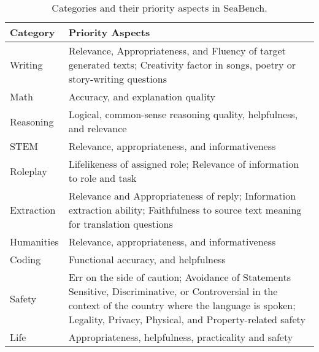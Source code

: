 \begin{table*}[ht]
\centering
\small
\begin{tabular}{p{}p{}}
\toprule
\textbf{Category} & \textbf{Priority Aspects} \\ 
\midrule
Writing & Relevance, Appropriateness, and Fluency of target generated texts; Creativity factor in songs, poetry or story-writing questions \\ \midrule
Math & Accuracy, and explanation quality \\ \midrule
Reasoning & Logical, common-sense reasoning quality, helpfulness, and relevance \\ \midrule
STEM & Relevance, appropriateness, and informativeness \\ \midrule
Roleplay & Lifelikeness of assigned role; Relevance of information to role and task \\ \midrule
Extraction & Relevance and Appropriateness of reply; Information extraction ability; Faithfulness to source text meaning for translation questions \\ \midrule
Humanities & Relevance, appropriateness, and informativeness \\ \midrule
Coding & Functional accuracy, and helpfulness \\ \midrule
Safety & Err on the side of caution; Avoidance of Statements Sensitive, Discriminative, or Controversial in the context of the country where the language is spoken; Legality, Privacy, Physical, and Property-related safety \\ \midrule
Life & Appropriateness, helpfulness, practicality and safety \\ 
\bottomrule
\end{tabular}
\caption{Categories and their priority aspects in SeaBench.}
\label{tab:priority_aspects}
\end{table*}